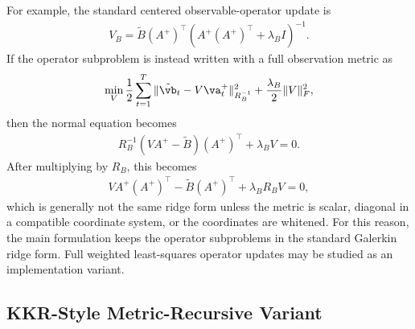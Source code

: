 \documentclass[twoside,11pt]{article}
\begin{document}
For example, the standard centered observable-operator update is
\begin{align}
V_B
=
\tilde B(A^+)^\top
\left(
A^+(A^+)^\top+\lambda_B I
\right)^{-1}.
\label{eq:app_standard_centered_VB_update}
\end{align}
If the operator subproblem is instead written with a full observation
metric as
\begin{align}
\min_V
\frac12
\sum_{t=1}^T
\|\tilde{\vb}_t - V\va_t^+\|_{R_B^{-1}}^2
+
\frac{\lambda_B}{2}
\|V\|_F^2,
\label{eq:app_metric_weighted_operator_problem}
\end{align}
then the normal equation becomes
\begin{align}
R_B^{-1}(VA^+ - \tilde B)(A^+)^\top
+
\lambda_B V
=
0.
\label{eq:app_metric_weighted_operator_normal}
\end{align}
After multiplying by $R_B$, this becomes
\begin{align}
V A^+(A^+)^\top
-
\tilde B(A^+)^\top
+
\lambda_B R_B V
=
0,
\label{eq:app_metric_weighted_operator_sylvester}
\end{align}
which is generally not the same ridge form unless the metric is scalar,
diagonal in a compatible coordinate system, or the coordinates are
whitened. For this reason, the main formulation keeps the operator
subproblems in the standard Galerkin ridge form. Full weighted
least-squares operator updates may be studied as an implementation
variant.

\subsection{KKR-Style Metric-Recursive Variant}
\end{document}
